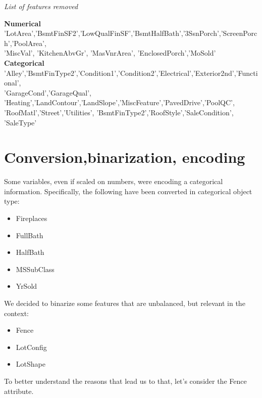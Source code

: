 \emph{List of features removed}

\textbf{Numerical}
'LotArea','BsmtFinSF2','LowQualFinSF','BsmtHalfBath','3SsnPorch','ScreenPorch','PoolArea',\\ 'MiscVal', 'KitchenAbvGr', 'MasVnrArea', 'EnclosedPorch','MoSold'\\ 
\textbf{Categorical}
'Alley','BsmtFinType2','Condition1','Condition2','Electrical','Exterior2nd','Functional',\\'GarageCond','GarageQual', 'Heating','LandContour','LandSlope','MiscFeature','PavedDrive','PoolQC',\\'RoofMatl','Street','Utilities', 'BsmtFinType2','RoofStyle','SaleCondition', 'SaleType'



\section{Conversion,binarization, encoding}
Some variables, even if scaled on numbers, were encoding a categorical information. Specifically, the following have been converted in categorical object type: 
\begin{itemize}
    \item Fireplaces
    \item FullBath
    \item HalfBath
    \item MSSubClass
    \item YrSold
\end{itemize}

We decided to binarize some features that are unbalanced, but relevant in the context:
\begin{itemize}
    \item Fence
    \item LotConfig
    \item LotShape
\end{itemize}

To better understand the reasons that lead us to that, let's consider the Fence attribute.

